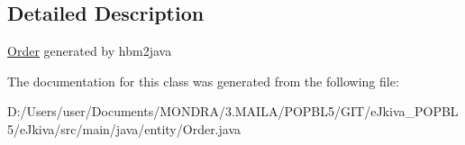 \subsection{Detailed Description}
\mbox{\hyperlink{classentity_1_1_order}{Order}} generated by hbm2java 

The documentation for this class was generated from the following file\+:\begin{DoxyCompactItemize}
\item 
D\+:/\+Users/user/\+Documents/\+M\+O\+N\+D\+R\+A/3.\+M\+A\+I\+L\+A/\+P\+O\+P\+B\+L5/\+G\+I\+T/e\+Jkiva\+\_\+\+P\+O\+P\+B\+L5/e\+Jkiva/src/main/java/entity/Order.\+java\end{DoxyCompactItemize}
